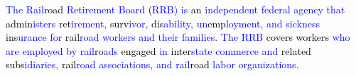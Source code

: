 \begin{tcolorbox}
    \textcolor{blue}{The} \textcolor{blue}{Rail}\textcolor{black}{road} \textcolor{blue}{Ret}\textcolor{blue}{irement} \textcolor{blue}{Board} \textcolor{black}{(}\textcolor{blue}{R}\textcolor{blue}{R}\textcolor{blue}{B}\textcolor{blue}{)} \textcolor{blue}{is} \textcolor{black}{an} \textcolor{blue}{independent} \textcolor{blue}{federal} \textcolor{blue}{ag}\textcolor{blue}{ency} \textcolor{blue}{that} \textcolor{black}{admin}\textcolor{blue}{ister}\textcolor{blue}{s} \textcolor{black}{ret}\textcolor{blue}{irement}\textcolor{blue}{,} \textcolor{black}{surv}\textcolor{blue}{iv}\textcolor{blue}{or}\textcolor{blue}{,} \textcolor{black}{dis}\textcolor{blue}{ability}\textcolor{blue}{,} \textcolor{blue}{un}\textcolor{black}{emp}\textcolor{blue}{loyment}\textcolor{blue}{,} \textcolor{blue}{and} \textcolor{blue}{sick}\textcolor{blue}{ness} \textcolor{black}{ins}\textcolor{blue}{urance} \textcolor{blue}{for} \textcolor{black}{rail}\textcolor{blue}{road} \textcolor{blue}{workers} \textcolor{blue}{and} \textcolor{blue}{their} \textcolor{blue}{families}\textcolor{black}{.} \textcolor{blue}{The} \textcolor{blue}{R}\textcolor{blue}{R}\textcolor{blue}{B} \textcolor{black}{covers} \textcolor{black}{workers} \textcolor{blue}{who} \textcolor{blue}{are} \textcolor{blue}{employed} \textcolor{blue}{by} \textcolor{blue}{rail}\textcolor{black}{ro}\textcolor{blue}{ads} \textcolor{black}{engaged} \textcolor{blue}{in} \textcolor{black}{inter}\textcolor{blue}{state} \textcolor{blue}{commerce} \textcolor{blue}{and} \textcolor{black}{related} \textcolor{black}{subs}\textcolor{blue}{idi}\textcolor{blue}{aries}\textcolor{blue}{,} \textcolor{black}{rail}\textcolor{blue}{road} \textcolor{blue}{associations}\textcolor{blue}{,} \textcolor{blue}{and} \textcolor{blue}{rail}\textcolor{black}{road} \textcolor{blue}{labor} \textcolor{blue}{organizations}\textcolor{blue}{.}
    

\end{tcolorbox}
